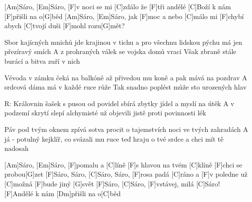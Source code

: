
[Am]Sáro, [Em]Sáro, [F]v noci se mi [C]zdálo 
že [F]tři andělé [C]Boží k nám [F]přišli na o[G]běd 
[Am]Sáro, [Em]Sáro, jak [F]moc a nebo [C]málo 
mi [F]chybí abych [C]tvojí duši [F]mohl rozu[G]mět? 

Sbor kajícných mnichů jde krajinou v tichu 
a pro všechnu lidskou pýchu 
má jen přezíravý smích 
A z prohraných válek se vojska domů vrací 
Však zbraně stále burácí 
a bitva zuří v nich 

Vévoda v zámku čeká na balkóně 
až přivedou mu koně 
a pak mává na pozdrav 
A srdcová dáma má v každé ruce růže 
Tak snadno poplést může 
sto urozených hlav 

R:
Královnin šašek s pusou od povidel 
sbírá zbytky jídel 
a myslí na útěk 
A v podzemí skrytí slepí alchymisté 
už objevili jistě 
proti povinnosti lék 

Páv pod tvým oknem zpívá sotva procit 
o tajemstvích noci 
ve tvých zahradách 
A já - potulný kejklíř, co svázali mu ruce 
teď hraju o tvé srdce 
a chci mít tě nadosah
\slpc

[Am]Sáro, [Em]Sáro, [F]pomalu a [C]líně 
[F]s hlavou na tvém [C]klíně [F]chci se probou[G]zet 
[F]Sáro, Sáro, [C]Sáro, Sáro, [F]rosa padá [C]ráno 
a [F]v poledne už [C]možná [F]bude jiný [G]svět 
[F]Sáro, [C]Sáro, [F]vstávej, milá [C]Sáro! 
[F]Andělé k nám [Dm]přišli na o[C]běd
